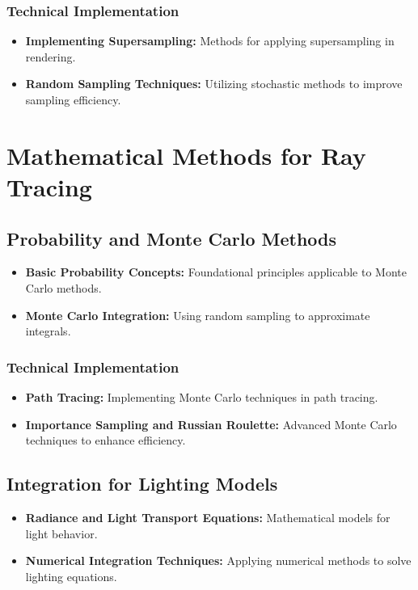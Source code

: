 \documentclass[12pt]{article}
\begin{document}
\subsubsection{Technical Implementation}
\begin{itemize}
    \item \textbf{Implementing Supersampling:} Methods for applying supersampling in rendering.
    \item \textbf{Random Sampling Techniques:} Utilizing stochastic methods to improve sampling efficiency.
\end{itemize}

\section{Mathematical Methods for Ray Tracing}
\label{sec:math-methods}
\subsection{Probability and Monte Carlo Methods}
\begin{itemize}
    \item \textbf{Basic Probability Concepts:} Foundational principles applicable to Monte Carlo methods.
    \item \textbf{Monte Carlo Integration:} Using random sampling to approximate integrals.
\end{itemize}
\subsubsection{Technical Implementation}
\begin{itemize}
    \item \textbf{Path Tracing:} Implementing Monte Carlo techniques in path tracing.
    \item \textbf{Importance Sampling and Russian Roulette:} Advanced Monte Carlo techniques to enhance efficiency.
\end{itemize}
\subsection{Integration for Lighting Models}
\begin{itemize}
    \item \textbf{Radiance and Light Transport Equations:} Mathematical models for light behavior.
    \item \textbf{Numerical Integration Techniques:} Applying numerical methods to solve lighting equations.
\end{itemize}
\end{document}
